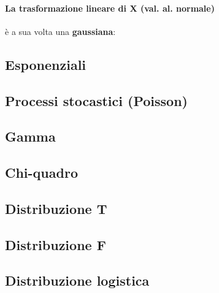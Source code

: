\documentclass[]{article}
\begin{document}
    \paragraph{La trasformazione lineare di X (val. al. normale)} è a sua volta una \textbf{gaussiana}:
    \subsection{Esponenziali}

    \subsection{Processi stocastici (Poisson)}

    \subsection{Gamma}

    \subsection{Chi-quadro}

    \subsection{Distribuzione T}

    \subsection{Distribuzione F}

    \subsection{Distribuzione logistica}
\end{document}
